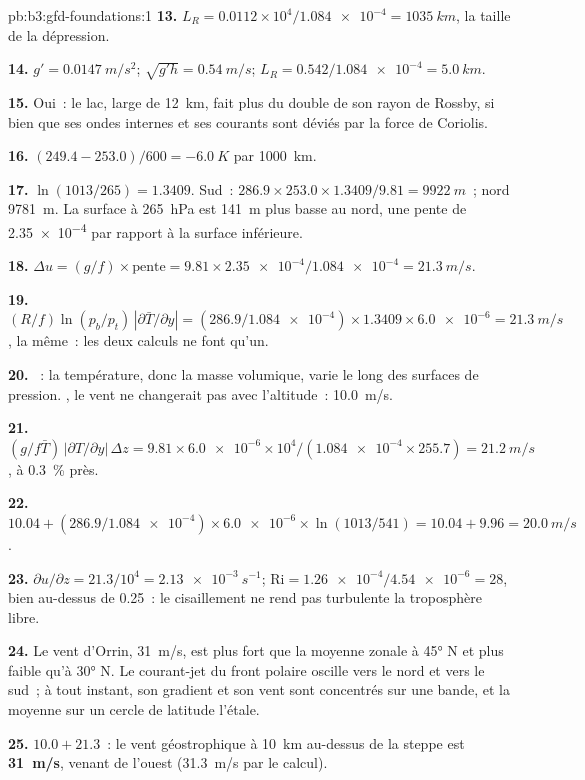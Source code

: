 \begin{solution}{pb:b3:gfd-foundations:1}
\textbf{13.} $L_R = 0.0112\times10^4/\num{1.084e-4} = \qty{1035}{km}$, la
taille de la dépression.

\textbf{14.} $g' = \qty{0.0147}{m/s^2}$; $\sqrt{g'h} = \qty{0.54}{m/s}$;
$L_R = 0.542/\num{1.084e-4} = \qty{5.0}{km}$.

\textbf{15.} Oui~: le lac, large de \qty{12}{km}, fait plus du double
de son rayon de Rossby, si bien que ses ondes internes et ses courants sont déviés par la
force de Coriolis.

\textbf{16.} $(249.4 - 253.0)/600 = \qty{-6.0}{K}$ par \qty{1000}{km}.

\textbf{17.} $\ln(1013/265) = 1.3409$. Sud~:
$286.9\times253.0\times1.3409/9.81 = \qty{9922}{m}$~; nord \qty{9781}{m}.
La surface à \qty{265}{hPa} est \qty{141}{m} plus basse au nord, une pente de
\num{2.35e-4} par rapport à la surface inférieure.

\textbf{18.} $\Delta u = (g/f)\times\text{pente} = 9.81\times\num{2.35e-4}/
\num{1.084e-4} = \qty{21.3}{m/s}$.

\textbf{19.} $(R/f)\ln(p_b/p_t)\,|\partial\bar T/\partial y| =
(286.9/\num{1.084e-4})\times1.3409\times\num{6.0e-6} = \qty{21.3}{m/s}$, la
même~: les deux calculs ne font qu'un.

\textbf{20.} ~: la température, donc la masse volumique, varie le long
des surfaces de pression. , le vent ne changerait pas avec l'altitude~:
\qty{10.0}{m/s}.

\textbf{21.} $(g/f\bar T)\,|\partial T/\partial y|\,\Delta z = 9.81\times
\num{6.0e-6}\times10^4/(\num{1.084e-4}\times255.7) = \qty{21.2}{m/s}$,
à \qty{0.3}{\percent} près.

\textbf{22.} $10.04 + (286.9/\num{1.084e-4})\times\num{6.0e-6}\times
\ln(1013/541) = 10.04 + 9.96 = \qty{20.0}{m/s}$.

\textbf{23.} $\partial u/\partial z = 21.3/10^4 = \qty{2.13e-3}{s^{-1}}$;
$\mathrm{Ri} = \num{1.26e-4}/\num{4.54e-6} = 28$, bien au-dessus de 0.25~: le cisaillement
ne rend pas turbulente la troposphère libre.

\textbf{24.} Le vent d'Orrin, \qty{31}{m/s}, est plus fort que la moyenne zonale
à \ang{45} N et plus faible qu'à \ang{30} N. Le courant-jet du front polaire oscille
vers le nord et vers le sud~; à tout instant, son gradient et son vent sont concentrés
sur une bande, et la moyenne sur un cercle de latitude l'étale.

\textbf{25.} $10.0 + 21.3$~: le vent géostrophique à \qty{10}{km} au-dessus de la
steppe est \textbf{\qty[text-series-to-math=true]{31}{m/s}}, venant de l'ouest
(\qty{31.3}{m/s} par le calcul).
\end{solution}
